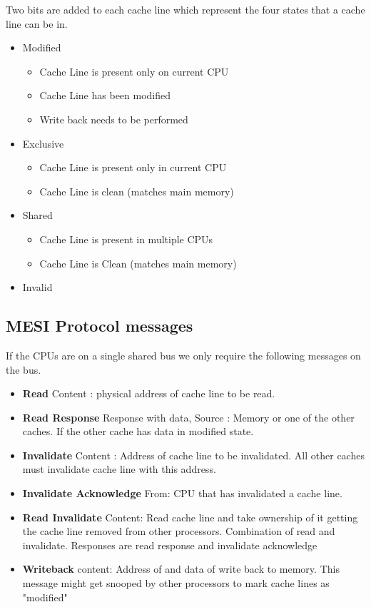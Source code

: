 \documentclass{article}
\begin{document}
Two bits are added to each cache line which represent the four states
that a cache line can be in.

\begin{itemize}
\item Modified
  \begin{itemize}
    \item Cache Line is present only on current CPU
    \item Cache Line has been modified
    \item Write back needs to be performed
  \end{itemize}


\item Exclusive
    \begin{itemize}
    \item Cache Line is present only in current CPU
    \item Cache Line is clean (matches main memory)
    \end{itemize}
    
  \item Shared
    \begin{itemize}
    \item Cache Line is present in multiple CPUs
    \item Cache Line is Clean (matches main memory)
    \end{itemize}
  \item Invalid 
\end{itemize}

\subsection{MESI Protocol messages}

If the CPUs are on a single shared bus we only require the following
messages on the bus.

\begin{itemize}
\item \textbf{Read} Content : physical address of cache line to be
  read.
\item \textbf{Read Response} Response with data, Source : Memory or
  one of the other caches. If the other cache has data in modified
  state.
\item \textbf{Invalidate} Content : Address of cache line to be
  invalidated. All other caches must invalidate cache line with this
  address.

\item \textbf{Invalidate Acknowledge} From: CPU that has invalidated a
  cache line.

\item \textbf{Read Invalidate} Content: Read cache line and take
  ownership of it getting the cache line removed from other
  processors. Combination of read and invalidate. Responses are read
  response and invalidate acknowledge

\item \textbf{Writeback} content: Address of and data of write back to
  memory. This message might get snooped by other processors to mark
  cache lines as "modified"  
\end{itemize}
\end{document}
